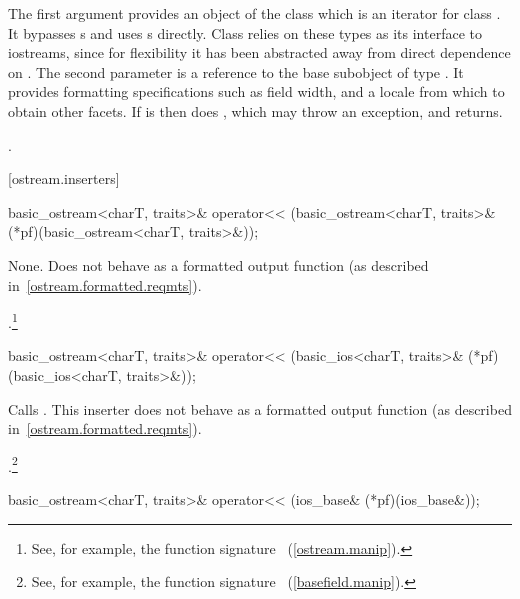 \begin{itemdescr}
\pnum
The first argument provides an object of the
class which is an iterator for class .
It bypasses
s
and uses
s
directly.
Class
relies on these types as its
interface to iostreams, since for flexibility it has been abstracted
away from direct dependence on
.
The second parameter is a reference to the base subobject of type
.
It provides formatting specifications such as field width, and
a locale from which to obtain other facets.
If
is
then does
,
which may throw an exception, and returns.

\pnum
\returns
{}.
\end{itemdescr}

[ostream.inserters]{}

%
\begin{itemdecl}
basic_ostream<charT, traits>& operator<<
    (basic_ostream<charT, traits>& (*pf)(basic_ostream<charT, traits>&));
\end{itemdecl}

\begin{itemdescr}
\pnum
\effects
None.
Does not behave as a formatted output function (as described
in~\ref{ostream.formatted.reqmts}).

\pnum
\returns
{}.\footnote{See, for example, the function signature
%
~(\ref{ostream.manip}).}
\end{itemdescr}

%
\begin{itemdecl}
basic_ostream<charT, traits>& operator<<
    (basic_ios<charT, traits>& (*pf)(basic_ios<charT, traits>&));
\end{itemdecl}

\begin{itemdescr}
\pnum
\effects
Calls
.
This inserter does not
behave as a formatted output function (as described in~\ref{ostream.formatted.reqmts}).

\pnum
\returns
{}.\footnote{See, for example, the function signature
%
~(\ref{basefield.manip}).}
\end{itemdescr}

%
\begin{itemdecl}
basic_ostream<charT, traits>& operator<<
    (ios_base& (*pf)(ios_base&));
\end{itemdecl}


